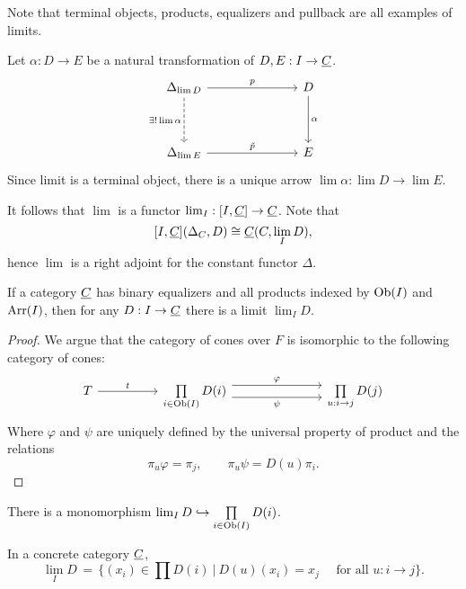 Note that terminal objects, products, equalizers and pullback are all examples of limits.

\vspace*{3mm}

Let \( \alpha: D \to E \) be a natural transformation of \( D, E: I \to \underline{C} \).
\[
	\begin{tikzcd}{\Delta_{\lim D}} &&& D \\
		\\
		{\Delta_{\lim E}} &&& E
		\arrow["p", from=1-1, to=1-4]
		\arrow["{\exists! \lim\alpha}"', dashed, from=1-1, to=3-1]
		\arrow["\alpha", from=1-4, to=3-4]
		\arrow["{\tilde{p}}", from=3-1, to=3-4]
	\end{tikzcd}
\]
Since limit is a terminal object, there is a unique arrow \( \lim \alpha: \lim D \to \lim E \).

\vspace*{4mm}

It follows that \( \lim \) is a functor \( \lim_I: [I, \underline{C}] \to \underline{C} \). Note that
\[
	[I, \underline{C}](\Delta_C, D) \cong \underline{C}(C, \lim_I D),
\]
hence \( \lim \) is a right adjoint for the constant functor \( \Delta \).

\begin{theorem*}
	If a category \( \underline{C} \) has binary equalizers and all products indexed by \( \operatorname{Ob}(I) \) and \( \operatorname{Arr}(I) \), then for any \( D: I \to \underline{C} \) there is a limit \( \lim_I D \).
\end{theorem*}
\begin{proof}
	We argue that the category of cones over \( F \) is isomorphic to the following category of cones:
	\[
		\begin{tikzcd}
			T && {\prod\limits_{i \in \text{Ob}(I)} D(i)} &&& {\prod\limits_{u: i \to j} D(j)}
			\arrow["t", from=1-1, to=1-3]
			\arrow["\varphi", shift left=2, from=1-3, to=1-6]
			\arrow["\psi"', shift right=2, from=1-3, to=1-6]
		\end{tikzcd}
	\]
	Where \( \varphi \) and \( \psi \) are uniquely defined by the universal property of product and the relations
	\[
		\pi_u \varphi = \pi_j, \qquad \pi_u \psi = D(u) \pi_i.
	\]
\end{proof}

\begin{corollary*}
	There is a monomorphism \( \lim_I D \hookrightarrow \prod\limits_{i \in \operatorname{Ob}(I)} D(i) \).
\end{corollary*}

\begin{example*}
	In a concrete category \( \underline{C} \),
	\[
		\lim_I D \,=\, \bigl\{(x_i) \in \prod D(i) ~\big|~ D(u)(x_i)=x_j \quad \text{ for all } u: i \to j\bigr\}.
	\]
\end{example*}


